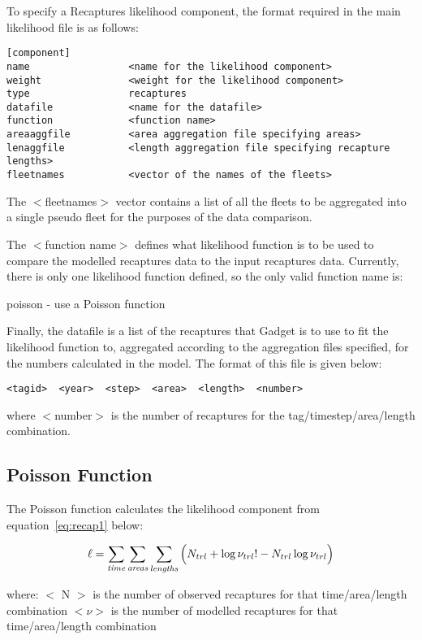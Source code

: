 \documentclass[10pt,twoside]{book}
\begin{document}
\bigskip
To specify a Recaptures likelihood component, the format required in the main likelihood file is as follows:

{\small\begin{verbatim}
[component]
name                 <name for the likelihood component>
weight               <weight for the likelihood component>
type                 recaptures
datafile             <name for the datafile>
function             <function name>
areaaggfile          <area aggregation file specifying areas>
lenaggfile           <length aggregation file specifying recapture lengths>
fleetnames           <vector of the names of the fleets>
\end{verbatim}}

The $<$fleetnames$>$ vector contains a list of all the fleets to be aggregated into a single pseudo fleet for the purposes of the data comparison.

\bigskip
The $<$function name$>$ defines what likelihood function is to be used to compare the modelled recaptures data to the input recaptures data.  Currently, there is only one likelihood function defined, so the only valid function name is:

\bigskip
poisson - use a Poisson function

\bigskip
Finally, the datafile is a list of the recaptures that Gadget is to use to fit the likelihood function to, aggregated according to the aggregation files specified, for the numbers calculated in the model. The format of this file is given below:

{\small\begin{verbatim}
<tagid>  <year>  <step>  <area>  <length>  <number>
\end{verbatim}}

where $<$number$>$ is the number of recaptures for the tag/timestep/area/length combination.

\subsection{Poisson Function}
The Poisson function calculates the likelihood component from equation~\ref{eq:recap1} below:

\begin{equation}\label{eq:recap1}
\ell = \sum_{\it time}\sum_{\it areas}\sum_{\it lengths} \Big( N_{trl} + \log \nu_{trl}! - N_{trl} \log \nu_{trl} \Big)
\end{equation}

where:\newline
$<$ N $>$ is the number of observed recaptures for that time/area/length combination\newline
$<\nu>$ is the number of modelled recaptures for that time/area/length combination
\end{document}
